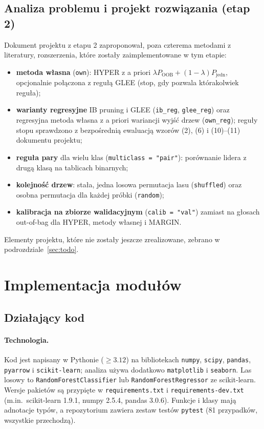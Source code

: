 \documentclass{article}
\newcommand{\code}[1]{\texttt{#1}}
\begin{document}
\subsection{Analiza problemu i projekt rozwiązania (etap 2)}

Dokument projektu z etapu 2 zaproponował, poza czterema metodami z literatury,
rozszerzenia, które zostały zaimplementowane w tym etapie:

\begin{itemize}[nosep]
  \item \textbf{metoda własna} (\code{own}): HYPER z a priori
        $\lambda P_{\mathrm{OOB}} + (1-\lambda) P_{\mathrm{jedn}}$, opcjonalnie połączona
        z regułą GLEE (stop, gdy pozwala którakolwiek reguła);
  \item \textbf{warianty regresyjne} IB pruning i GLEE (\code{ib\_reg}, \code{glee\_reg})
        oraz regresyjna metoda własna z a priori wariancji wyjść drzew (\code{own\_reg});
        reguły stopu sprawdzono z bezpośrednią ewaluacją wzorów (2), (6) i (10)--(11)
        dokumentu projektu;
  \item \textbf{reguła pary} dla wielu klas (\code{multiclass = "pair"}): porównanie
        lidera z drugą klasą na tablicach binarnych;
  \item \textbf{kolejność drzew}: stała, jedna losowa permutacja lasu
        (\code{shuffled}) oraz osobna permutacja dla każdej próbki (\code{random});
  \item \textbf{kalibracja na zbiorze walidacyjnym} (\code{calib = "val"}) zamiast na
        głosach out-of-bag dla HYPER, metody własnej i MARGIN.
\end{itemize}

Elementy projektu, które nie zostały jeszcze zrealizowane, zebrano w
podrozdziale~\ref{sec:todo}.

\section{Implementacja modułów}

\subsection{Działający kod}

\paragraph{Technologia.}
Kod jest napisany w Pythonie ($\ge 3.12$) na bibliotekach \code{numpy}, \code{scipy},
\code{pandas}, \code{pyarrow} i \code{scikit-learn}; analiza używa dodatkowo
\code{matplotlib} i \code{seaborn}. Las losowy to \code{RandomForestClassifier} lub
\code{RandomForestRegressor} ze scikit-learn. Wersje pakietów są przypięte w
\code{requirements.txt} i \code{requirements-dev.txt} (m.in.\ scikit-learn 1.9.1,
numpy 2.5.4, pandas 3.0.6). Funkcje i klasy mają adnotacje typów,
a repozytorium zawiera zestaw testów \code{pytest} (81 przypadków, wszystkie przechodzą).
\end{document}
